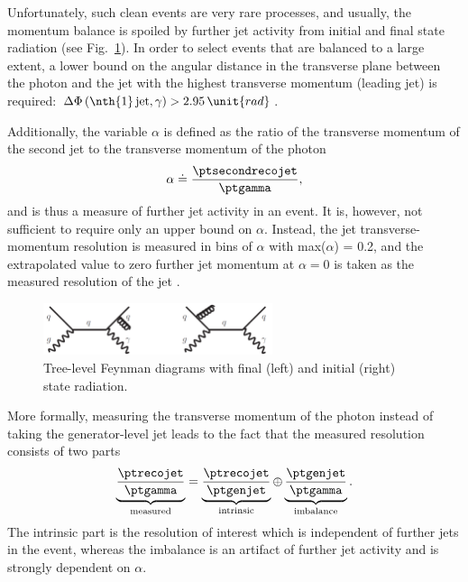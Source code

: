 Unfortunately, such clean events are very rare processes, and usually, the momentum balance is spoiled by further jet activity from initial and final state radiation (see Fig.~\ref{res:fig:FeynmanDiagramsWithRadiation}). 
In order to select events that are balanced to a large extent, a lower bound on the angular distance in the transverse plane between the photon and the jet with the highest transverse momentum (leading jet) is required: $\Delta\Phi \left(\text{\nth{1}\,jet,\,} \gamma \right)>2.95\,\unit{rad}$. 

Additionally, the variable $\alpha$ is defined as the ratio of the transverse momentum of the second jet to the transverse momentum of the photon
\begin{equation}
\label{res:eq:alphaDef}
\alpha \doteq \frac{\ptsecondrecojet}{\ptgamma},
\end{equation} 
and is thus a measure of further jet activity in an event. 
It is, however, not sufficient to require only an upper bound on $\alpha$. 
Instead, the jet transverse-momentum resolution is measured in bins of $\alpha$ with max($\alpha$) = 0.2, 
and the extrapolated value to zero further jet momentum at $\alpha=0$ is taken as the measured resolution of the jet \pt. %
\begin{figure}[t]
  \centering
      \includegraphics[width=0.60\textwidth]{figures/resolution/generalApproach/FeynmanDiagramsWithRadiation.pdf}
  \caption{Tree-level Feynman diagrams with final (left) and initial (right) state radiation.}  
  \label{res:fig:FeynmanDiagramsWithRadiation}
\end{figure}

More formally, measuring the transverse momentum of the photon instead of taking the generator-level jet \pt leads to the fact that the measured resolution consists of two parts
\begin{equation}\label{res:eq:splitting}
\underbrace{\frac{\ptrecojet}{\ptgamma}}_{\text{measured}} = \underbrace{\frac{\ptrecojet}{\ptgenjet}}_{\text{intrinsic}} \oplus \underbrace{\frac{\ptgenjet}{\ptgamma}}_{\text{imbalance}}.
\end{equation}
The intrinsic part is the resolution of interest which is independent of further jets in the event, whereas the imbalance is an artifact of further jet activity and is strongly dependent on $\alpha$.


